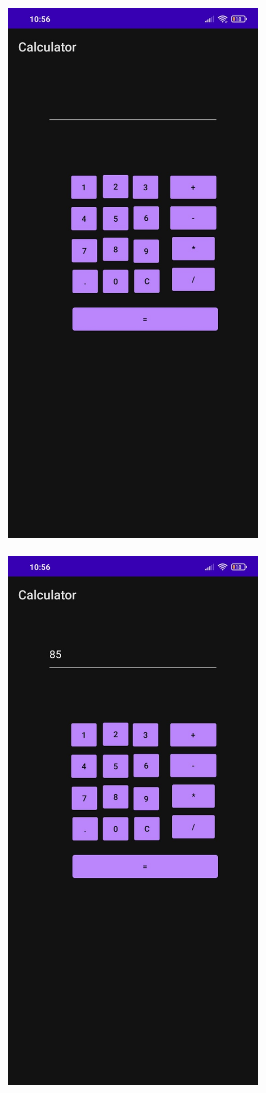 \documentclass[12pt,letterpaper]{article}
\begin{document}
\subsection*{}
\begin{figure}[h]
    \centering
    \includegraphics[height=14cm, keepaspectratio]{Calculator/Outputs/OP1.jpeg}
\end{figure}
\begin{figure}
    \centering
    \includegraphics[height=14cm, keepaspectratio]{Calculator/Outputs/OP2.jpeg}
\end{figure}
\end{document}
